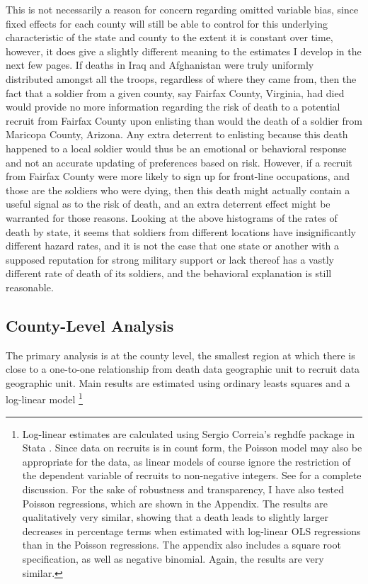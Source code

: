 \documentclass[12pt] {article}
\begin{document}
This is not necessarily a reason for concern regarding omitted variable bias,
since fixed effects for each county will still be able to control for
this underlying characteristic of the state and county to the extent it is constant over time, however, it does give a slightly different meaning to the estimates I develop in the next few pages. If deaths in Iraq and Afghanistan were truly uniformly
distributed amongst all the troops, regardless of where they came
from, then the fact that a soldier from a given county, say Fairfax
County, Virginia, had died would provide no more information regarding
the risk of death to a potential recruit from Fairfax County upon
enlisting than would the death of a soldier from Maricopa County,
Arizona. Any extra deterrent to enlisting because this death happened to a local soldier would thus be an emotional or behavioral response and not
an accurate updating of preferences based on risk. However, if a recruit
from Fairfax County were more likely to sign up for front-line occupations,
and those are the soldiers who were dying, then this death might actually
contain a useful signal as to the risk of death, and an extra deterrent
effect might be warranted for those reasons. Looking at the above
histograms of the rates of death by state, it seems that soldiers
from different locations have insignificantly different hazard rates, and
it is not the case that one state or another with a supposed reputation
for strong military support or lack thereof has a vastly different
rate of death of its soldiers, and the behavioral explanation is still reasonable.


\subsection{County-Level Analysis\label{sub:County OLS}}

The primary analysis is at the county level, the smallest region at which there is close to a one-to-one relationship from death data geographic unit to recruit data geographic unit. Main results are estimated using ordinary leasts squares and a log-linear model \footnote{Log-linear estimates are calculated using Sergio Correia's reghdfe package in Stata \citep{reghdfe}. Since data on recruits is in count form, the Poisson model may also be appropriate for the data, as linear models of course ignore the restriction of the dependent variable of recruits to non-negative integers. See \cite{cameron2013countdata} for a complete discussion. For the sake of robustness and transparency, I have also tested Poisson regressions, which are shown in the Appendix. The results are qualitatively very similar, showing that a death leads to slightly larger decreases in percentage terms when estimated with log-linear OLS regressions than in the Poisson regressions. The appendix also includes a square root specification, as well as negative binomial. Again, the results are very similar.} 
\end{document}
